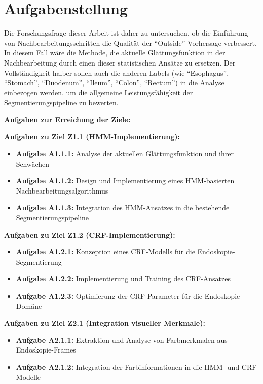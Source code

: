 \section{Aufgabenstellung}

Die Forschungsfrage dieser Arbeit ist daher zu untersuchen, ob die Einführung von Nachbearbeitungsschritten die Qualität der \enquote{Outside}-Vorhersage verbessert. In diesem Fall wäre die Methode, die aktuelle Glättungsfunktion in der Nachbearbeitung durch einen dieser statistischen Ansätze zu ersetzen.
Der Vollständigkeit halber sollen auch die anderen Labels (wie \enquote{Esophagus}, \enquote{Stomach}, \enquote{Duodenum}, \enquote{Ileum}, \enquote{Colon}, \enquote{Rectum}) in die Analyse einbezogen werden, um die allgemeine Leistungsfähigkeit der Segmentierungspipeline zu bewerten.

\textbf{Aufgaben zur Erreichung der Ziele:}

\textbf{Aufgaben zu Ziel Z1.1 (HMM-Implementierung):}
\begin{itemize}
\item \textbf{Aufgabe A1.1.1:} Analyse der aktuellen Glättungsfunktion und ihrer Schwächen
\item \textbf{Aufgabe A1.1.2:} Design und Implementierung eines HMM-basierten Nachbearbeitungsalgorithmus
\item \textbf{Aufgabe A1.1.3:} Integration des HMM-Ansatzes in die bestehende Segmentierungspipeline
\end{itemize}

\textbf{Aufgaben zu Ziel Z1.2 (CRF-Implementierung):}
\begin{itemize}
\item \textbf{Aufgabe A1.2.1:} Konzeption eines CRF-Modells für die Endoskopie-Segmentierung
\item \textbf{Aufgabe A1.2.2:} Implementierung und Training des CRF-Ansatzes
\item \textbf{Aufgabe A1.2.3:} Optimierung der CRF-Parameter für die Endoskopie-Domäne
\end{itemize}

\textbf{Aufgaben zu Ziel Z2.1 (Integration visueller Merkmale):}
\begin{itemize}
\item \textbf{Aufgabe A2.1.1:} Extraktion und Analyse von Farbmerkmalen aus Endoskopie-Frames
\item \textbf{Aufgabe A2.1.2:} Integration der Farbinformationen in die HMM- und CRF-Modelle
\end{itemize}


